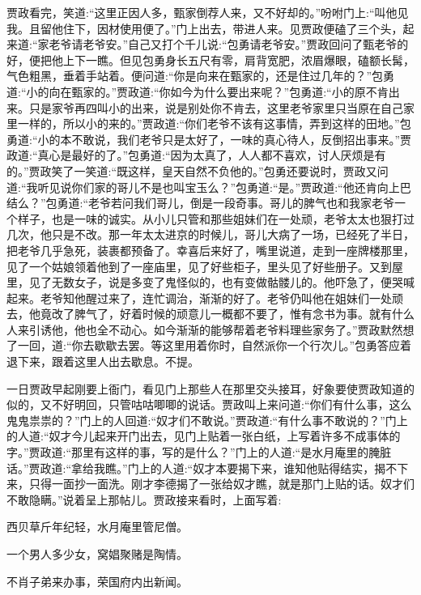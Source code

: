 \begin{parag}
    贾政看完，笑道:“这里正因人多，甄家倒荐人来，又不好却的。”吩咐门上:“叫他见我。且留他住下，因材使用便了。”门上出去，带进人来。见贾政便磕了三个头，起来道:“家老爷请老爷安。”自己又打个千儿说:“包勇请老爷安。”贾政回问了甄老爷的好，便把他上下一瞧。但见包勇身长五尺有零，肩背宽肥，浓眉爆眼，磕额长髯，气色粗黑，垂着手站着。便问道:“你是向来在甄家的，还是住过几年的？”包勇道:“小的向在甄家的。”贾政道:“你如今为什么要出来呢？”包勇道:“小的原不肯出来。只是家爷再四叫小的出来，说是别处你不肯去，这里老爷家里只当原在自己家里一样的，所以小的来的。”贾政道:“你们老爷不该有这事情，弄到这样的田地。”包勇道:“小的本不敢说，我们老爷只是太好了，一味的真心待人，反倒招出事来。”贾政道:“真心是最好的了。”包勇道:“因为太真了，人人都不喜欢，讨人厌烦是有的。”贾政笑了一笑道:“既这样，皇天自然不负他的。”包勇还要说时，贾政又问道:“我听见说你们家的哥儿不是也叫宝玉么？”包勇道:“是。”贾政道:“他还肯向上巴结么？”包勇道:“老爷若问我们哥儿，倒是一段奇事。哥儿的脾气也和我家老爷一个样子，也是一味的诚实。从小儿只管和那些姐妹们在一处顽，老爷太太也狠打过几次，他只是不改。那一年太太进京的时候儿，哥儿大病了一场，已经死了半日，把老爷几乎急死，装裹都预备了。幸喜后来好了，嘴里说道，走到一座牌楼那里，见了一个姑娘领着他到了一座庙里，见了好些柜子，里头见了好些册子。又到屋里，见了无数女子，说是多变了鬼怪似的，也有变做骷髅儿的。他吓急了，便哭喊起来。老爷知他醒过来了，连忙调治，渐渐的好了。老爷仍叫他在姐妹们一处顽去，他竟改了脾气了，好着时候的顽意儿一概都不要了，惟有念书为事。就有什么人来引诱他，他也全不动心。如今渐渐的能够帮着老爷料理些家务了。”贾政默然想了一回，道:“你去歇歇去罢。等这里用着你时，自然派你一个行次儿。”包勇答应着退下来，跟着这里人出去歇息。不提。
\end{parag}


\begin{parag}
    一日贾政早起刚要上衙门，看见门上那些人在那里交头接耳，好象要使贾政知道的似的，又不好明回，只管咕咕唧唧的说话。贾政叫上来问道:“你们有什么事，这么鬼鬼祟祟的？”门上的人回道:“奴才们不敢说。”贾政道:“有什么事不敢说的？”门上的人道:“奴才今儿起来开门出去，见门上贴着一张白纸，上写着许多不成事体的字。”贾政道:“那里有这样的事，写的是什么？”门上的人道:“是水月庵里的腌脏话。”贾政道:“拿给我瞧。”门上的人道:“奴才本要揭下来，谁知他贴得结实，揭不下来，只得一面抄一面洗。刚才李德揭了一张给奴才瞧，就是那门上贴的话。奴才们不敢隐瞒。”说着呈上那帖儿。贾政接来看时，上面写着:
\end{parag}


\begin{poem}
    \begin{pl}
        西贝草斤年纪轻，水月庵里管尼僧。
    \end{pl}


    \begin{pl}
        一个男人多少女，窝娼聚赌是陶情。
    \end{pl}


    \begin{pl}
        不肖子弟来办事，荣国府内出新闻。
    \end{pl}
\end{poem}


